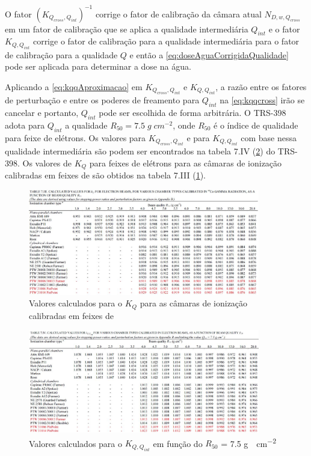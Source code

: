 \documentclass[11pt,a4paper]{article}
\begin{document}
		O fator $(K_{Q_{cross},Q_{int}})^{-1}$ corrige o fator de calibração da câmara atual $N_{D,w,Q_{cross}}$ em um fator de calibração que se aplica a qualidade intermediária $Q_{int}$ e o fator $K_{Q,Q_{int}}$ corrige o fator de calibração para a qualidade intermediária para o fator de calibração para a qualidade $Q$ e então a  \ref{eq:doseAguaCorrigidaQualidade} pode ser aplicada para determinar a dose na água.

		Aplicando a \ref{eq:kqqAproximacao} em  $K_{Q_{cross},Q_{int}}$ e $K_{Q,Q_{int}}$, a razão entre os fatores de perturbação e entre os poderes de freamento para $Q_{int}$ na \ref{eq:kqqcross} irão se cancelar e portanto, $Q_{int}$ pode ser escolhida de forma arbitrária. O TRS-398 adota para $Q_{int}$ a qualidade $R_{50} = 7.5 \; g \; cm^{-2}$, onde $R_{50}$ é o índice de qualidade para feixe de elétrons. Os valores para $K_{Q_{cross},Q_{int}}$ e para  $K_{Q,Q_{int}}$ com base nessa qualidade intermediária são podem ser encontrados na tabela 7.IV (\ref{fig:tabela74trs398}) do TRS-398. Os valores de $K_Q$ para feixes de elétrons para as câmaras de ionização calibradas em feixes de  são obtidos na tabela 7.III (\ref{fig:tabela73trs398}).

		\begin{figure}[h]
			\centering
			\includegraphics[width=0.9\textwidth]{Imagens/tabela73trs398.JPG}
			\caption{Valores calculados para o $K_Q$ para as câmaras de ionização calibradas em feixes de  }
			\label{fig:tabela73trs398}
		\end{figure}

		\begin{figure}[h]
			\centering
			\includegraphics[width=0.9\textwidth]{Imagens/tabela74trs398.JPG}
			\caption{Valores calculados para o $K_{Q,Q_{int}}$ em função do $R_{50}$ = 7.5 \unit{g \cdot cm^{-2}} }
			\label{fig:tabela74trs398}
		\end{figure}
 
\end{document}
